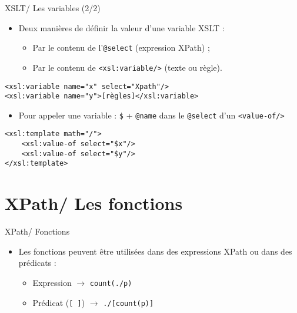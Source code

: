 \documentclass{beamer}
\begin{document}
    \begin{frame}[fragile]{XSLT/ Les variables (2/2)}
        \Large
        \begin{itemize}
            \item Deux manières de définir la valeur d'une variable XSLT :
            \begin{itemize}
                \item Par le contenu de l'\texttt{@select} (expression XPath) ;
                \item Par le contenu de \texttt{<xsl:variable/>} (texte ou règle).
            \end{itemize}
        \end{itemize}
        \normalsize
        \begin{verbatim}
<xsl:variable name="x" select="Xpath"/>
<xsl:variable name="y">[règles]</xsl:variable>
        \end{verbatim}
        \Large
        \begin{itemize}
            \item  Pour appeler une variable : \texttt{\$} + \texttt{@name} dans le \texttt{@select} d'un \texttt{<value-of/>}
        \end{itemize}
        \normalsize
        \begin{verbatim}
<xsl:template math="/">
    <xsl:value-of select="$x"/>
    <xsl:value-of select="$y"/>
</xsl:template>
        \end{verbatim}
    \end{frame}

    \section{XPath/ Les fonctions}

    \begin{frame}{XPath/ Fonctions}
        \Large
        \begin{itemize}
            \item Les fonctions peuvent être utilisées dans des expressions XPath ou dans des prédicats :
            \begin{itemize}
            \Large
                \item Expression $\rightarrow$ \texttt{count(./p)}
                \item Prédicat (\texttt{[ ]}) $\rightarrow$ \texttt{./[count(p)]}
            \end{itemize}
        \end{itemize}
    \end{frame}
\end{document}
